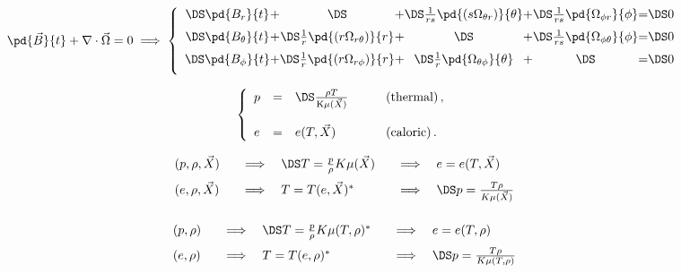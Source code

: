 \documentclass{article}
\begin{document}
\[
    \pd{\vec{B}}{t} + \nabla\cdot\vec{\Omega} = 0
     \; \Longrightarrow \;
     \left\{\begin{array}{c@{+}c@{+}c@{+}c@{=}c}
     \DS \pd{B_{r}}{t}                                       & \DS
                                                        & \DS
     \frac{1}{rs}  \pd{(s \Omega_{\theta r})}{\theta} & \DS
     \frac{1}{rs}  \pd{\Omega_{\phi r}}{\phi}         & \DS 0
     \\ \noalign{\medskip}
     \DS \pd{B_{\theta}}{t}                      & \DS
     \frac{1}{r} \pd{(r\Omega_{r\theta})}{r}      & \DS
                                              & \DS
     \frac{1}{rs}\pd{\Omega_{\phi\theta}}{\phi}   & \DS 0
     \\ \noalign{\medskip}
     \DS \pd{B_{\phi}}{t}                          & \DS
     \frac{1}{r} \pd{(r\Omega_{r\phi})}{r}          & \DS
     \frac{1}{r} \pd{  \Omega_{\theta\phi}}{\theta} & \DS
                                              & \DS 0
     \\ \noalign{\medskip}
     \end{array}\right.
   \]
\pagebreak

\[
 \left\{\begin{array}{lcll}
 p &=&\DS \frac{\rho T}{{\rm K}\mu(\vec{X})} &\qquad\rm{(thermal)}\,,
   \\ \noalign{\bigskip}
 e &=&    e(T,\vec{X}) &\qquad\rm{(caloric)}\,.
 \end{array}\right.
 \]
\pagebreak

\[ \begin{array}{lll}
        (p,\rho,\vec{X}) &\quad\Longrightarrow\quad \DS T = \frac{p}{\rho}K\mu(\vec{X}) 
          &\quad\Longrightarrow\quad e = e(T,\vec{X})   
          \\ \noalign{\medskip}
      (e,\rho,\vec{X}) &\quad\Longrightarrow\quad T = T(e,\vec{X})^* 
          &\quad\Longrightarrow\quad \DS p = \frac{T\rho}{K\mu(\vec{X})} 
          \\ \noalign{\medskip}
        \end{array}
    \]
\pagebreak

\[ \begin{array}{lll}
    (p,\rho) &\quad\Longrightarrow\quad \DS T = \frac{p}{\rho}K\mu(T,\rho)^*
            &\quad\Longrightarrow\quad e = e(T,\rho)
          \\ \noalign{\medskip}
 (e,\rho) &\quad\Longrightarrow\quad T = T(e,\rho)^*
          &\quad\Longrightarrow\quad \DS p = \frac{T\rho}{K\mu(T,\rho)} 
          \\ \noalign{\medskip}
\end{array}
  \]
\pagebreak
\end{document}
